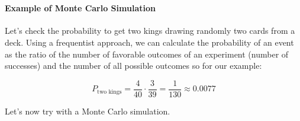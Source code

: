 \documentclass[11pt]{article}
\begin{document}
    \begin{center}
    \end{center}
    { \hspace*{\fill} \\}
    
    \hypertarget{example-of-monte-carlo-simulation}{%
\paragraph{Example of Monte Carlo
Simulation}\label{example-of-monte-carlo-simulation}}

Let's check the probability to get two kings drawing randomly two cards
from a deck. Using a frequentist approach, we can calculate the
probability of an event as the ratio of the number of favorable outcomes
of an experiment (number of successes) and the number of all possible
outcomes so for our example:

\[P_\textrm{two kings} = \frac{4}{40} \cdot \frac{3}{39} = \frac{1}{130} \approx 0.0077\]

Let's now try with a Monte Carlo simulation.
\end{document}
